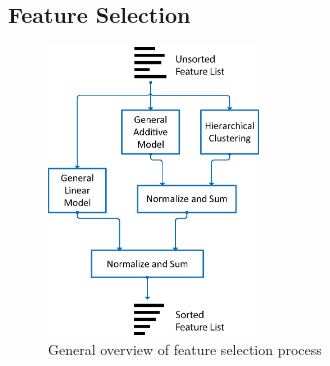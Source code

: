 \subsection{Feature Selection}
\begin{figure}
\includegraphics[height=3.0in]{featureSelectionProcess.eps}
\caption{General overview of feature selection process}
\label{feature_selection_process}
\end{figure}
